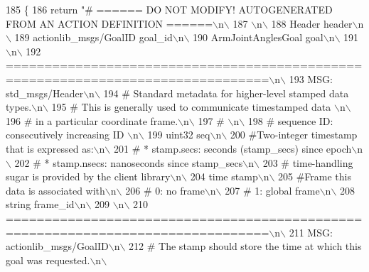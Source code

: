\begin{DoxyCode}
185   \{
186     \textcolor{keywordflow}{return} \textcolor{stringliteral}{"# ====== DO NOT MODIFY! AUTOGENERATED FROM AN ACTION DEFINITION ======\(\backslash\)n\(\backslash\)}
187 \textcolor{stringliteral}{\(\backslash\)n\(\backslash\)}
188 \textcolor{stringliteral}{Header header\(\backslash\)n\(\backslash\)}
189 \textcolor{stringliteral}{actionlib\_msgs/GoalID goal\_id\(\backslash\)n\(\backslash\)}
190 \textcolor{stringliteral}{ArmJointAnglesGoal goal\(\backslash\)n\(\backslash\)}
191 \textcolor{stringliteral}{\(\backslash\)n\(\backslash\)}
192 \textcolor{stringliteral}{================================================================================\(\backslash\)n\(\backslash\)}
193 \textcolor{stringliteral}{MSG: std\_msgs/Header\(\backslash\)n\(\backslash\)}
194 \textcolor{stringliteral}{# Standard metadata for higher-level stamped data types.\(\backslash\)n\(\backslash\)}
195 \textcolor{stringliteral}{# This is generally used to communicate timestamped data \(\backslash\)n\(\backslash\)}
196 \textcolor{stringliteral}{# in a particular coordinate frame.\(\backslash\)n\(\backslash\)}
197 \textcolor{stringliteral}{# \(\backslash\)n\(\backslash\)}
198 \textcolor{stringliteral}{# sequence ID: consecutively increasing ID \(\backslash\)n\(\backslash\)}
199 \textcolor{stringliteral}{uint32 seq\(\backslash\)n\(\backslash\)}
200 \textcolor{stringliteral}{#Two-integer timestamp that is expressed as:\(\backslash\)n\(\backslash\)}
201 \textcolor{stringliteral}{# * stamp.secs: seconds (stamp\_secs) since epoch\(\backslash\)n\(\backslash\)}
202 \textcolor{stringliteral}{# * stamp.nsecs: nanoseconds since stamp\_secs\(\backslash\)n\(\backslash\)}
203 \textcolor{stringliteral}{# time-handling sugar is provided by the client library\(\backslash\)n\(\backslash\)}
204 \textcolor{stringliteral}{time stamp\(\backslash\)n\(\backslash\)}
205 \textcolor{stringliteral}{#Frame this data is associated with\(\backslash\)n\(\backslash\)}
206 \textcolor{stringliteral}{# 0: no frame\(\backslash\)n\(\backslash\)}
207 \textcolor{stringliteral}{# 1: global frame\(\backslash\)n\(\backslash\)}
208 \textcolor{stringliteral}{string frame\_id\(\backslash\)n\(\backslash\)}
209 \textcolor{stringliteral}{\(\backslash\)n\(\backslash\)}
210 \textcolor{stringliteral}{================================================================================\(\backslash\)n\(\backslash\)}
211 \textcolor{stringliteral}{MSG: actionlib\_msgs/GoalID\(\backslash\)n\(\backslash\)}
212 \textcolor{stringliteral}{# The stamp should store the time at which this goal was requested.\(\backslash\)n\(\backslash\)}

\end{DoxyCode}
